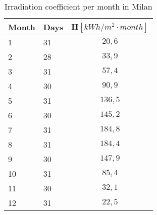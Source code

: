 \begin{table}[h!]
\centering
\begin{tabular}{|l|l|c|}
\hline
\rowcolor{bluepoli!40} \textbf{Month} & \textbf{Days} & \multicolumn{1}{l|}{\textbf{H}$[ kWh/m^2\cdot month]$} \\ \hline
1              & 31            & $20,6$                          \\ \hline
2              & 28            & $33,9$                          \\ \hline
3              & 31            & $57,4$                          \\ \hline
4              & 30            & $90,9$                          \\ \hline
5              & 31            & $136,5$                         \\ \hline
6              & 30            & $145,2$                         \\ \hline
7              & 31            & $184,8$                         \\ \hline
8              & 31            & $184,4$                         \\ \hline
9              & 30            & $147,9$                         \\ \hline
10             & 31            & $85,4$                          \\ \hline
11             & 30            & $32,1$                          \\ \hline
12             & 31            & $22,5$                          \\ \hline
\end{tabular}
\caption{Irradiation coefficient per month in Milan\textsuperscript{\cite{PVINFOSYSTEM}}}
\label{tab:hmilan}
\end{table}